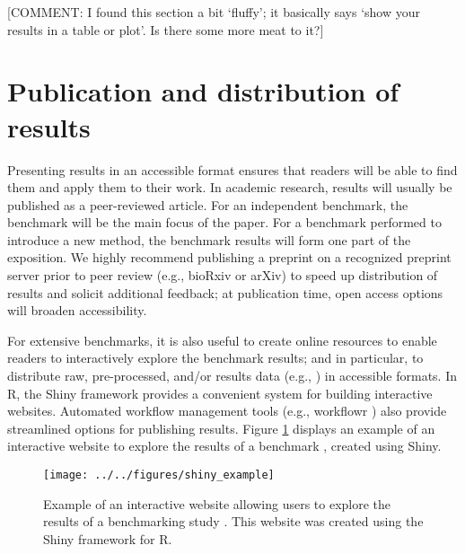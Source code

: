\documentclass[12pt, a4paper]{article}
\begin{document}
[COMMENT: I found this section a bit `fluffy'; it basically says `show your results in a table or plot'. Is there some more meat to it?]




\section*{Publication and distribution of results}

Presenting results in an accessible format ensures that readers will be able to find them and apply them to their work. In academic research, results will usually be published as a peer-reviewed article. For an independent benchmark, the benchmark will be the main focus of the paper. For a benchmark performed to introduce a new method, the benchmark results will form one part of the exposition. We highly recommend publishing a preprint on a recognized preprint server prior to peer review (e.g., bioRxiv or arXiv) to speed up distribution of results and solicit additional feedback; at publication time, open access options will broaden accessibility.

For extensive benchmarks, it is also useful to create online resources to enable readers to interactively explore the benchmark results; and in particular, to distribute raw, pre-processed, and/or results data (e.g., \citep{Soneson2018, Soneson2016, Wiwie2015, Bokulich2016, Conchuir2015}) in accessible formats. In R, the Shiny framework provides a convenient system for building interactive websites. Automated workflow management tools (e.g., workflowr \citep{Blischak2018}) also provide streamlined options for publishing results. Figure \ref{fig:shiny} displays an example of an interactive website to explore the results of a benchmark \citep{Saelens2018b}, created using Shiny.





\vskip 5mm

\begin{figure}[H]
\begin{center}
\texttt{[image: ../../figures/shiny\_example]}
\end{center}
\caption{Example of an interactive website allowing users to explore the results of a benchmarking study \citep{Saelens2018b}. This website was created using the Shiny framework for R.}
\label{fig:shiny}
\end{figure}
\end{document}
